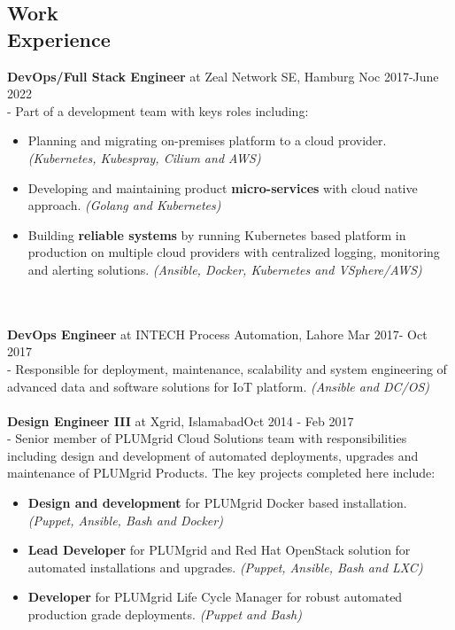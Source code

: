 \documentclass[margin]{res}
\begin{document}
\begin{resume}
\section{Work \\ Experience}
\textbf{DevOps/Full Stack Engineer} at Zeal Network SE, Hamburg \hfill     Noc 2017-June 2022 \\
- Part of a development team with keys roles including:
    \begin{itemize}
      \item Planning and migrating on-premises platform to a cloud provider. \textit{(Kubernetes, Kubespray, Cilium and AWS)}
      \item Developing and maintaining product \textbf{micro-services} with cloud native approach. \textit{(Golang and Kubernetes)}
      \item Building \textbf{reliable systems} by running Kubernetes based platform in production on multiple cloud providers with centralized logging, monitoring and alerting solutions. \textit{(Ansible, Docker, Kubernetes and VSphere/AWS)}
    \end{itemize}    \\ \\
\textbf{DevOps Engineer} at INTECH Process Automation, Lahore \hfill     Mar 2017- Oct 2017 \\
- Responsible for deployment, maintenance, scalability and system engineering of advanced data and software solutions for IoT platform. \textit{(Ansible and DC/OS)}   \\ \\
{\bf Design Engineer III} at Xgrid, Islamabad\hfill     Oct 2014 - Feb 2017 \\
- Senior member of PLUMgrid Cloud Solutions team with responsibilities including design and development of automated deployments, upgrades and maintenance of PLUMgrid Products. The key projects completed here include:
    \begin{itemize}  \itemsep -2pt %
        \item \textbf{Design and development} for PLUMgrid Docker based installation. \textit{(Puppet, Ansible, Bash and Docker)}
        \item \textbf{Lead Developer} for PLUMgrid and Red Hat OpenStack solution for automated installations and upgrades. \textit{(Puppet, Ansible, Bash and LXC)}
        \item \textbf{Developer} for PLUMgrid Life Cycle Manager for robust automated production grade deployments. \textit{(Puppet and Bash)}
    \end{itemize}


\end{resume}
\end{document}
